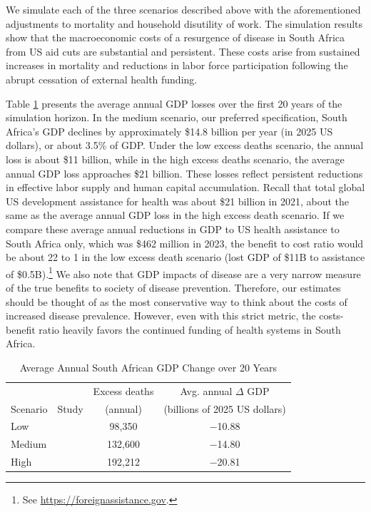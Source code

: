 \documentclass[letterpaper,12pt]{article}
\theoremstyle{definition}
\begin{document}
\begin{spacing}{1.5}
We simulate each of the three scenarios described above with the aforementioned adjustments to mortality and household disutility of work. The simulation results show that the macroeconomic costs of a resurgence of disease in South Africa from US aid cuts are substantial and persistent. These costs arise from sustained increases in mortality and reductions in labor force participation following the abrupt cessation of external health funding.

Table \ref{tab:avgGDPChange} presents the average annual GDP losses over the first 20 years of the simulation horizon. In the medium scenario, our preferred specification, South Africa's GDP declines by approximately \$\num{14.8} billion per year (in 2025 US dollars), or about \num{3.5}\% of GDP. Under the low excess deaths scenario, the annual loss is about \$11 billion, while in the high excess deaths scenario, the average annual GDP loss approaches \$21 billion. These losses reflect persistent reductions in effective labor supply and human capital accumulation. Recall that total global US development assistance for health was about \$21 billion in 2021, about the same as the average annual GDP loss in the high excess death scenario. If we compare these average annual reductions in GDP to US health assistance to South Africa only, which was \$462 million in 2023, the benefit to cost ratio would be about 22 to 1 in the low excess death scenario (lost GDP of \$11B to assistance of \$\num{0.5}B).\footnote{See \href{https://foreignassistance.gov}{https://foreignassistance.gov}.} We also note that GDP impacts of disease are a very narrow measure of the true benefits to society of disease prevention. Therefore, our estimates should be thought of as the most conservative way to think about the costs of increased disease prevalence. However, even with this strict metric, the costs-benefit ratio heavily favors the continued funding of health systems in South Africa.

\begin{table}[H] \centering \captionsetup{width=6.0in}
  \caption{\label{tab:avgGDPChange}Average Annual South African GDP Change over 20 Years}
  \begin{tabular}{llcc}
    \hline\hline
             &       & Excess deaths & Avg. annual $\Delta$ GDP \\[-1.5mm]
    \multicolumn{1}{c}{Scenario} & \multicolumn{1}{c}{Study} & (annual) & (billions of 2025 US dollars) \\
    \hline\hline
    Low    & \citet{Brink2025}  &  98,350 & \num{-10.88} \\
    Medium & \citet{Gandhi2025} & 132,600 & \num{-14.80} \\
    High   & \citet{KS2025}     & 192,212 & \num{-20.81} \\
    \hline\hline
  \end{tabular}
\end{table}


\end{spacing}
\end{document}
